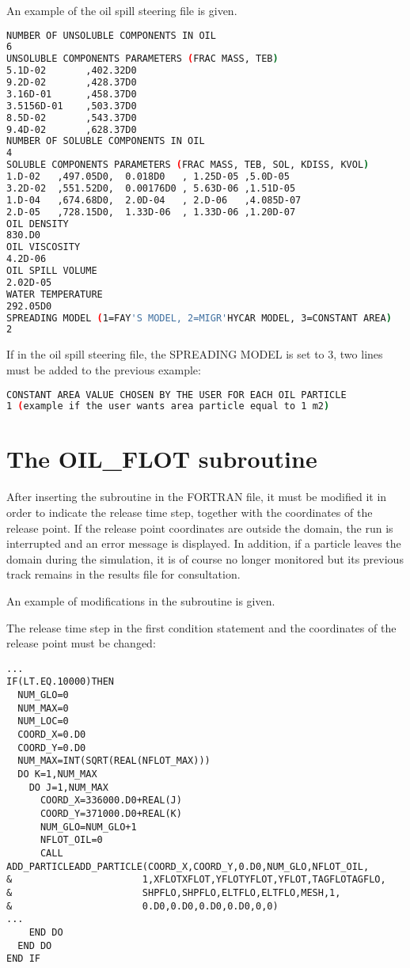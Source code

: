 An example of the oil spill steering file is given.

\begin{lstlisting}[language=bash]
NUMBER OF UNSOLUBLE COMPONENTS IN OIL
6
UNSOLUBLE COMPONENTS PARAMETERS (FRAC MASS, TEB)
5.1D-02       ,402.32D0
9.2D-02       ,428.37D0
3.16D-01      ,458.37D0
3.5156D-01    ,503.37D0
8.5D-02       ,543.37D0
9.4D-02       ,628.37D0
NUMBER OF SOLUBLE COMPONENTS IN OIL
4
SOLUBLE COMPONENTS PARAMETERS (FRAC MASS, TEB, SOL, KDISS, KVOL)
1.D-02   ,497.05D0,  0.018D0   , 1.25D-05 ,5.0D-05
3.2D-02  ,551.52D0,  0.00176D0 , 5.63D-06 ,1.51D-05
1.D-04   ,674.68D0,  2.0D-04   , 2.D-06   ,4.085D-07
2.D-05   ,728.15D0,  1.33D-06  , 1.33D-06 ,1.20D-07
OIL DENSITY
830.D0
OIL VISCOSITY
4.2D-06
OIL SPILL VOLUME
2.02D-05
WATER TEMPERATURE
292.05D0
SPREADING MODEL (1=FAY'S MODEL, 2=MIGR'HYCAR MODEL, 3=CONSTANT AREA)
2
\end{lstlisting}

If in the oil spill steering file, the SPREADING MODEL is set to 3, two lines
must be added to the previous example:

\begin{lstlisting}[language=bash]
CONSTANT AREA VALUE CHOSEN BY THE USER FOR EACH OIL PARTICLE
1 (example if the user wants area particle equal to 1 m2)
\end{lstlisting}


\section{The OIL\_FLOT subroutine}

After inserting the  subroutine in the FORTRAN file, it must
be modified it in order to indicate the release time step, together with the
coordinates of the release point. If the release point coordinates are outside
the domain, the run is interrupted and an error message is displayed. In
addition, if a particle leaves the domain during the simulation, it is of
course no longer monitored but its previous track remains in the results file
for consultation.

An example of modifications in the  subroutine is given.

The release time step in the first condition statement and the coordinates of
the release point must be changed:

\begin{lstlisting}[language=TelFortran]
...
IF(LT.EQ.10000)THEN
  NUM_GLO=0
  NUM_MAX=0
  NUM_LOC=0
  COORD_X=0.D0
  COORD_Y=0.D0
  NUM_MAX=INT(SQRT(REAL(NFLOT_MAX)))
  DO K=1,NUM_MAX
    DO J=1,NUM_MAX
      COORD_X=336000.D0+REAL(J)
      COORD_Y=371000.D0+REAL(K)
      NUM_GLO=NUM_GLO+1
      NFLOT_OIL=0
      CALL ADD_PARTICLEADD_PARTICLE(COORD_X,COORD_Y,0.D0,NUM_GLO,NFLOT_OIL,
&                       1,XFLOTXFLOT,YFLOTYFLOT,YFLOT,TAGFLOTAGFLO,
&                       SHPFLO,SHPFLO,ELTFLO,ELTFLO,MESH,1,
&                       0.D0,0.D0,0.D0,0.D0,0,0)
...
    END DO
  END DO
END IF
\end{lstlisting}


